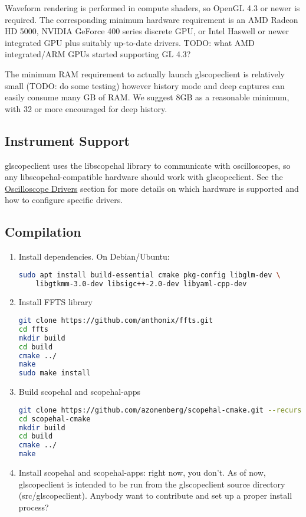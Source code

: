 Waveform rendering is performed in compute shaders, so OpenGL 4.3 or newer is required. The corresponding minimum
hardware requirement is an AMD Radeon HD 5000, NVIDIA GeForce 400 series discrete GPU, or Intel Haswell or newer
integrated GPU plus suitably up-to-date drivers. TODO: what AMD integrated/ARM GPUs started supporting GL 4.3?

The minimum RAM requirement to actually launch glscopeclient is relatively small (TODO: do some testing) however
history mode and deep captures can easily consume many GB of RAM. We suggest 8GB as a reasonable minimum, with 32 or
more encouraged for deep history.

\subsection{Instrument Support}

glscopeclient uses the libscopehal library to communicate with oscilloscopes, so any libscopehal-compatible hardware
should work with glscopeclient. See the \hyperref[sec:drivers]{Oscilloscope Drivers} section for more details on which
hardware is supported and how to configure specific drivers.

\subsection{Compilation}

\begin{enumerate}

\item Install dependencies. On Debian/Ubuntu:
\begin{lstlisting}[language=sh]
sudo apt install build-essential cmake pkg-config libglm-dev \
	libgtkmm-3.0-dev libsigc++-2.0-dev libyaml-cpp-dev
\end{lstlisting}

\item Install FFTS library
\begin{lstlisting}[language=sh]
git clone https://github.com/anthonix/ffts.git
cd ffts
mkdir build
cd build
cmake ../
make
sudo make install
\end{lstlisting}

\item Build scopehal and scopehal-apps
\begin{lstlisting}[language=sh]
git clone https://github.com/azonenberg/scopehal-cmake.git --recurse-submodules
cd scopehal-cmake
mkdir build
cd build
cmake ../
make
\end{lstlisting}

\item Install scopehal and scopehal-apps: right now, you don't. As of now, glscopeclient is intended to be run from the
glscopeclient source directory (src/glscopeclient). Anybody want to contribute and set up a proper install process?

\end{enumerate}

